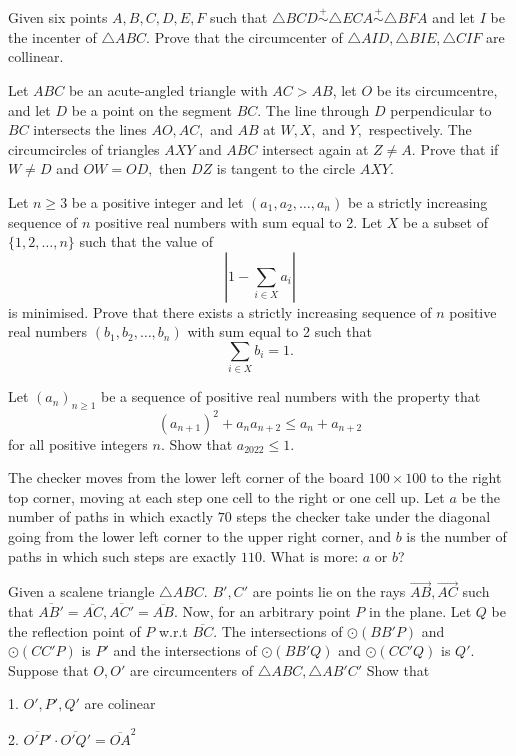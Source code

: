 \documentclass[11pt]{scrartcl}
\begin{document}
\begin{problem}[902621191535073]
Given six points $ A, B, C, D, E, F $ such that $ \triangle BCD \stackrel{+}{\sim} \triangle ECA \stackrel{+}{\sim} \triangle BFA $ and let $ I $ be the incenter of $ \triangle ABC. $ Prove that the circumcenter of $ \triangle AID, \triangle BIE, \triangle CIF $ are collinear.
\end{problem}
\begin{problem}[282712203118607]
	Let $ABC$ be an acute-angled triangle with $AC > AB$, let $O$ be its circumcentre, and let $D$ be a point on the segment $BC$. The line through $D$ perpendicular to $BC$ intersects the lines $AO, AC,$ and $AB$ at $W, X,$ and $Y,$ respectively. The circumcircles of triangles $AXY$ and $ABC$ intersect again at $Z \ne A$.
Prove that if $W \ne D$ and $OW = OD,$ then $DZ$ is tangent to the circle $AXY.$
\end{problem}
\begin{problem}[290912955085727393]
Let $n \geqslant 3$ be a positive integer and let $\left(a_{1}, a_{2}, \ldots, a_{n}\right)$ be a strictly increasing sequence of $n$ positive real numbers with sum equal to 2. Let $X$ be a subset of $\{1,2, \ldots, n\}$ such that the value of
\[
\left|1-\sum_{i \in X} a_{i}\right|
\]is minimised. Prove that there exists a strictly increasing sequence of $n$ positive real numbers $\left(b_{1}, b_{2}, \ldots, b_{n}\right)$ with sum equal to 2 such that
\[
\sum_{i \in X} b_{i}=1.
\]
\end{problem}
\begin{problem}[633974672407561]
Let $(a_n)_{n\geq 1}$ be a sequence of positive real numbers with the property that
$$(a_{n+1})^2 + a_na_{n+2} \leq a_n + a_{n+2}$$for all positive integers $n$. Show that $a_{2022}\leq 1$.
\end{problem}
\begin{problem}[677860185151955]
	The checker moves from the lower left corner of the board $100 \times 100$ to the right top corner, moving at each step one cell to the right or one cell up. Let $a$ be the number of paths in which exactly $70$ steps the checker take under the diagonal going from the lower left corner to the upper right corner, and $b$ is the number of paths in which such steps are exactly $110$. What is more: $a$ or $b$?
\end{problem}
\begin{problem}[1810915585111530473]
	Given a scalene triangle $ \triangle ABC $. $ B', C' $ are points lie on the rays $ \overrightarrow{AB}, \overrightarrow{AC}  $ such that $ \overline{AB'} = \overline{AC}, \overline{AC'} = \overline{AB} $. Now, for an arbitrary point $ P $ in the plane. Let $ Q $ be the reflection point of $ P $ w.r.t $ \overline{BC} $. The intersections of $ \odot{\left(BB'P\right)} $ and $ \odot{\left(CC'P\right)} $ is $ P' $ and the intersections of $ \odot{\left(BB'Q\right)} $ and $ \odot{\left(CC'Q\right)} $ is $ Q' $. Suppose that $ O, O' $ are circumcenters of $ \triangle{ABC}, \triangle{AB'C'} $ Show that

1. $ O', P', Q' $ are colinear

2. $  \overline{O'P'} \cdot  \overline{O'Q'} = \overline{OA}^{2} $
\end{problem}
\end{document}
